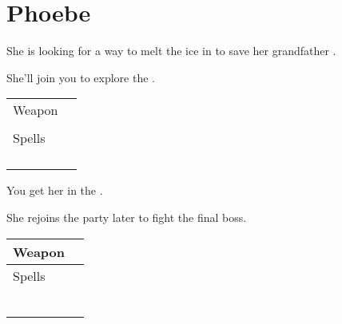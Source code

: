 \section{Phoebe}
\label{char:phoebe}


She is looking for a way to melt the ice in  to save her grandfather .

She’ll join you to explore the .

\bigskip
\begin{tabular}{ l | l }
	Weapon & \nameref{weapon:cat_claw} \\
	& \nameref{weapon:bow_of_grace} \\
	\hline
	Spells & \nameref{spell:cure} \\
	& \nameref{spell:heal} \\
	& \nameref{spell:life} \\
	& \nameref{spell:fire} \\
	& \nameref{spell:thunder}
\end{tabular}
\bigskip

You get her  in the .

\bigskip

She rejoins the party later to fight the final boss.

\bigskip
\begin{tabular}{ l | l }
	Weapon & \nameref{weapon:bow_of_grace} \\
	\hline
	Spells & \nameref{spell:cure} \\
	& \nameref{spell:heal} \\
	& \nameref{spell:life} \\
	& \nameref{spell:blizzard} \\
	& \nameref{spell:fire} \\
	& \nameref{spell:thunder} \\
	& \nameref{spell:white}
\end{tabular}
\bigskip
